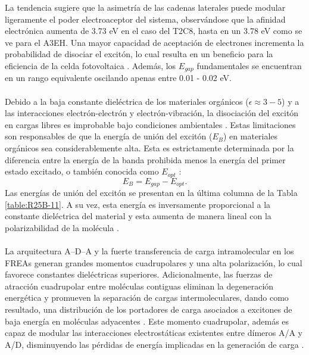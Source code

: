 \noindent La tendencia sugiere que la asimetría de las cadenas laterales puede modular ligeramente el poder electroaceptor del sistema, observándose que la afinidad electrónica aumenta de 3.73 eV en el caso del T2C8, hasta en un 3.78 eV como se ve para el A3EH. Una mayor capacidad de aceptación de electrones incrementa la probabilidad de disociar el excitón, lo cual resulta en un beneficio para la eficiencia de la celda fotovoltaica \cite{kiven2024enhancing}. Además, los $E_{gap}$ fundamentales se encuentran en un rango equivalente oscilando apenas entre 0.01 - 0.02 eV.  \\ \\
Debido a la baja constante dieléctrica de los materiales orgánicos ($\epsilon \approx 3 − 5$) y a las interacciones electrón-electrón y electrón-vibración, la disociación del excitón en cargas libres es improbable bajo condiciones ambientales \cite{scharber2013efficiency, bredas2014mind}. Estas limitaciones son responsables de que la energía de unión del excitón ($E_B$) en materiales orgánicos sea considerablemente alta. Esta es estrictamente determinada por la diferencia entre la energía de la banda prohibida menos la energía del primer estado excitado, o también conocida como $E_{opt}$ \cite{bisquertcap3, mubashar2021designing}:
\begin{equation}
E_{B}=E_{gap}-E_{opt} .
\end{equation} 
Las energías de unión del excitón se presentan en la última columna de la Tabla \ref{table:R25B-11}. A su vez, esta energía es inversamente proporcional a la constante dieléctrica del material y esta aumenta de manera lineal con la polarizabilidad de la molécula  \cite{wang2022principles}. \\ \\ La arquitectura A–D–A y la fuerte transferencia de carga intramolecular en los FREAs generan grandes momentos cuadrupolares y una alta polarización, lo cual favorece constantes dieléctricas superiores. Adicionalmente, las fuerzas de atracción cuadrupolar entre moléculas contiguas eliminan la degeneración energética y promueven la separación de cargas intermoleculares, dando como resultado,  una distribución de los portadores de carga asociados a excitones de baja energía en moléculas adyacentes \cite{liu2020charge}. Este momento cuadrupolar, además es capaz de modular las interacciones electrostáticas existentes entre dímeros A/A y A/D, disminuyendo las pérdidas de energía implicadas en la generación de carga \cite{dai2025modulation}. \\ \\
